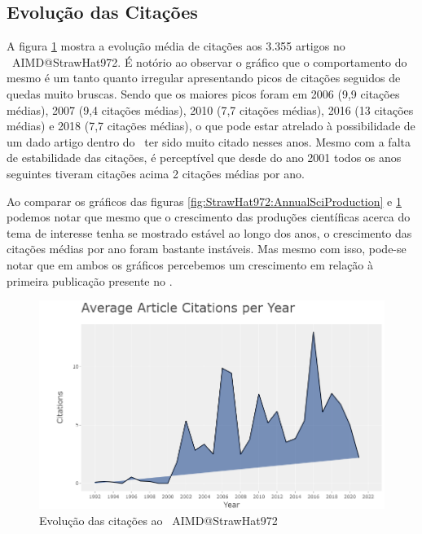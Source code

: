 \subsection{Evolução das Citações}
\label{StrawHat972:EvolCit}

A figura \ref{fig:StrawHat972:CitationPerYear} mostra a evolução média de citações aos 3.355 artigos no \dataset\ AIMD@StrawHat972. É notório ao observar o gráfico que o comportamento do mesmo é um tanto quanto irregular apresentando picos de citações seguidos de quedas muito bruscas. Sendo que os maiores picos foram em 2006 (9,9 citações médias), 2007 (9,4 citações médias), 2010 (7,7 citações médias), 2016 (13 citações médias) e 2018 (7,7 citações médias), o que pode estar atrelado à possibilidade de um dado artigo dentro do \dataset\ ter sido muito citado nesses anos. Mesmo com a falta de estabilidade das citações, é perceptível que desde do ano 2001 todos os anos seguintes tiveram citações acima 2 citações médias por ano.

Ao comparar os gráficos das figuras \ref{fig:StrawHat972:AnnualSciProduction} e \ref{fig:StrawHat972:CitationPerYear} podemos notar que mesmo que o crescimento das produções científicas acerca do tema de interesse tenha se mostrado estável ao longo dos anos, o crescimento das citações médias por ano foram bastante instáveis. Mas mesmo com isso, pode-se notar que em ambos os gráficos percebemos um crescimento em relação à primeira publicação presente no \dataset.

\begin{figure}[H]
    \centering
    \includegraphics[width=1\textwidth]{experiments/StrawHat972/PesqBibliogr/IA-DeteccaoMalware/WoS-20220209/Imagens/AIMDAverageCitationsPerYear.png}
    \caption{Evolução das citações ao \dataset\ AIMD@StrawHat972}
    \label{fig:StrawHat972:CitationPerYear}
\end{figure}

